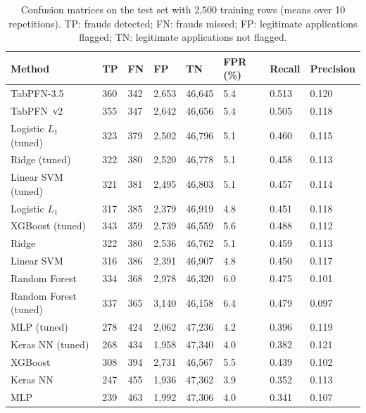 \begin{table}[htbp]
\caption{Confusion matrices on the test set with 2{,}500 training rows (means over 10 repetitions). TP: frauds detected; FN: frauds missed; FP: legitimate applications flagged; TN: legitimate applications not flagged.}
\label{tab:conf2500}
\begin{tabular*}{\tblwidth}{@{}LLLLLLLL@{}}
\toprule
Method & TP & FN & FP & TN & FPR (\%) & Recall & Precision \\
\midrule
TabPFN-3.5 & 360 & 342 & 2{,}653 & 46{,}645 & 5.4 & 0.513 & 0.120 \\
TabPFN~v2 & 355 & 347 & 2{,}642 & 46{,}656 & 5.4 & 0.505 & 0.118 \\
Logistic $L_1$ (tuned) & 323 & 379 & 2{,}502 & 46{,}796 & 5.1 & 0.460 & 0.115 \\
Ridge (tuned) & 322 & 380 & 2{,}520 & 46{,}778 & 5.1 & 0.458 & 0.113 \\
Linear SVM (tuned) & 321 & 381 & 2{,}495 & 46{,}803 & 5.1 & 0.457 & 0.114 \\
Logistic $L_1$ & 317 & 385 & 2{,}379 & 46{,}919 & 4.8 & 0.451 & 0.118 \\
XGBoost (tuned) & 343 & 359 & 2{,}739 & 46{,}559 & 5.6 & 0.488 & 0.112 \\
Ridge & 322 & 380 & 2{,}536 & 46{,}762 & 5.1 & 0.459 & 0.113 \\
Linear SVM & 316 & 386 & 2{,}391 & 46{,}907 & 4.8 & 0.450 & 0.117 \\
Random Forest & 334 & 368 & 2{,}978 & 46{,}320 & 6.0 & 0.475 & 0.101 \\
Random Forest (tuned) & 337 & 365 & 3{,}140 & 46{,}158 & 6.4 & 0.479 & 0.097 \\
MLP (tuned) & 278 & 424 & 2{,}062 & 47{,}236 & 4.2 & 0.396 & 0.119 \\
Keras NN (tuned) & 268 & 434 & 1{,}958 & 47{,}340 & 4.0 & 0.382 & 0.121 \\
XGBoost & 308 & 394 & 2{,}731 & 46{,}567 & 5.5 & 0.439 & 0.102 \\
Keras NN & 247 & 455 & 1{,}936 & 47{,}362 & 3.9 & 0.352 & 0.113 \\
MLP & 239 & 463 & 1{,}992 & 47{,}306 & 4.0 & 0.341 & 0.107 \\
\bottomrule
\end{tabular*}
\end{table}

